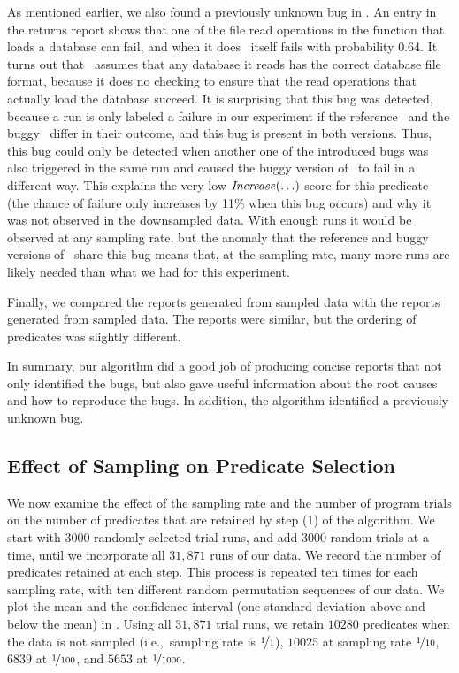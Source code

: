 As mentioned earlier,  we also found a  previously unknown bug in \moss.
An entry in the returns report shows that one of
the file read operations in the function that loads a database can
fail, and when it does \moss\ itself fails with probability 0.64.
It turns out that \moss\ assumes that any database it reads has the
correct database file format, because it does no checking to ensure
that the read operations that actually load the database succeed.  
It is surprising that this bug was detected,
because a run is only labeled a failure in our experiment if the
reference \moss\ and the buggy \moss\ differ in their outcome, and
this bug is present in both versions.  Thus, this bug could only be detected
when another one of the introduced bugs was also triggered in the same
run and caused the buggy version of \moss\ to fail in a different way.
This explains the very low $\mbox{\textit{Increase}}(\ldots)$ score for this
predicate (the chance of failure only increases by 11\% when this bug
occurs) and why it was not observed in the 
downsampled data.  With enough runs it would be observed at
any sampling rate, but the anomaly that the reference and buggy
versions of \moss\ share this bug means that, at the
 sampling rate, many more runs are likely needed
than what we had for this experiment.

Finally, we compared the reports generated from  sampled data
with the reports generated from  sampled data.  The reports were
similar, but the ordering of  predicates was slightly different.

In summary, our algorithm did a good job of producing concise reports that not
only identified the bugs, but also gave useful information about the root causes and
how to reproduce the bugs.  In addition, the algorithm identified a previously unknown
bug.

\subsection{Effect of Sampling on Predicate Selection}

We now examine the effect of the sampling rate and the number of
program trials on the number of predicates that are retained by step
(1) of the algorithm.
We start with $3000$ randomly
selected trial runs, and add $3000$ random trials at a time, until we
incorporate all $31,871$ runs of our data.  We record the number of
predicates retained at each step.  This process is repeated ten times
for each sampling rate, with ten different random permutation sequences
of our data. We plot the mean and the confidence interval (one
standard deviation above and below the mean) in
.  Using all $31,871$ trial runs, we retain $10280$ 
predicates when the data is not sampled (i.e.,\ sampling rate is 
$\nicefrac{1}{1}$), $10025$ at sampling
rate $\nicefrac{1}{10}$, $6839$ at $\nicefrac{1}{100}$, and $5653$ at
$\nicefrac{1}{1000}$.

